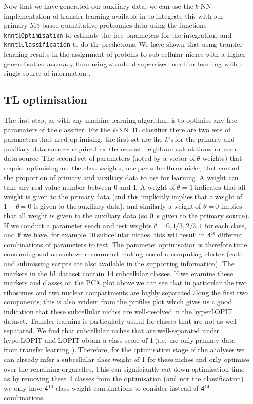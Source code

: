 Now that we have generated our auxiliary data, we can use the
\textit{k}-NN implementation of transfer learning available in
 to integrate this with our primary MS-based
quantitative proteomics data using the functions
\texttt{knntlOptimisation} to estimate the free-parameters for the
integration, and \texttt{knntlClassification} to do the
predictions. We have shown that using transfer learning results in the
assignment of proteins to sub-cellular niches with a higher
generalisation accuracy than using standard supervised machine
learning with a single source of information \cite{Breckels:2016}.

\subsection*{TL optimisation}

The first step, as with any machine learning algorithm, is to optimise
any free paramaters of the classifier. For the $k$-NN TL classifier
there are two sets of parameters that need optimising: the first set
are the $k$'s for the primary and auxiliary data sources required for
the nearest neighbour calculations for each data source. The second
set of parameters (noted by a vector of $\theta$ weights) that require
optimising are the class weights, one per subcellular niche, that
control the proportion of primary and auxiliary data to use for
learning. A weight can take any real value number between 0 and 1. A
weight of $\theta = 1$ indicates that all weight is given to the
primary data (and this implicitly implies that a weight of
$1 - \theta = 0$ is given to the auxiliary data), and similarly a
weight of $\theta = 0$ implies that all weight is given to the
auxiliary data (so 0 is given to the primary source). If we conduct a
parameter seach and test weights $\theta = {0, 1/3, 2/3, 1}$ for each
class, and if we have, for example 10 subcellular niches, this will
result in \texttt{4$^{10}$} different combinations of parameters to
test. The parameter optimisation is therefore time consuming and as
such we recommend making use of a computing cluster (code and
submissing scripts are also available in the supporting
information). The markers in the \texttt{hl} dataset contain 14
subcellular classes. If we examine these markers and classes on the
PCA plot above we can see that in particular the two ribosomes and two
nuclear compartments are highly separated along the first two
components, this is also evident from the profiles plot which gives us
a good indication that these subcellular niches are well-resolved in
the hyperLOPIT dataset. Transfer learning is particularly useful for
classes that are not as well separated. We find that subcellular
niches that are well-separated under hyperLOPIT and LOPIT obtain a
class score of 1 (i.e. use only primary data from transfer learning
\cite{Breckels:2016}). Therefore, for the optimisation stage of the
analyses we can already infer a subcellular class weight of 1 for
these niches and only optimise over the remaining organelles.  This
can signifciantly cut down optimisation time as by removing these 4
classes from the optimisation (and not the classification) we only
have \texttt{4$^{10}$} class weight combinations to consider instead
of \texttt{4$^{14}$} combinations.

